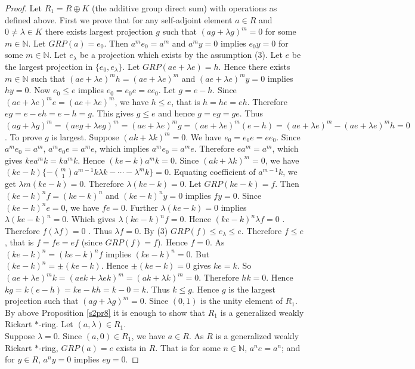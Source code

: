 \documentclass[10pt,a4paper]{amsart}
\begin{document}
\begin{proof} Let $ R_1 = R\oplus K$ (the additive group direct sum) with operations as defined above. First we prove that for any self-adjoint element $a\in R$ and $0 \ne \lambda \in K$ there exists largest projection $g$ such that $(ag+\lambda g)^m=0$ for some $m\in\mathbb N $. Let $GRP(a)=e_0$.
	Then  $a^me_0=a^m$ and $a^my=0$ implies $e_0y=0$ for some $m\in\mathbb N$. 
	Let $e_\lambda$ be a projection which exists by the assumption (3).
	Let $e$ be the largest projection in $\{e_0,e_\lambda\}$.
	Let $GRP(ae+\lambda e)=h$. Hence there exists $ m\in\mathbb N$ such that $(ae+\lambda e)^mh=(ae+\lambda e)^m$ and  $(ae+\lambda e)^my=0$ implies $hy=0$.  Now $e_0\leq e$ implies $e_0=e_0e=ee_0$.
	Let $g = e-h$.	Since $(ae+\lambda e)^me=(ae+\lambda e)^m$, we have $h\leq e$, that is $h=he =eh$. Therefore $eg=e-eh=e-h=g$. This gives $g\leq e$ and hence $g=eg=ge$.
	Thus $(ag+\lambda g)^m=(a eg+\lambda eg)^m=(ae+\lambda e)^mg
	=(ae+\lambda e)^m(e-h)=(ae+\lambda e)^m-(ae+\lambda e)^mh=0$.
	To prove $g$ is largest. Suppose $(ak+\lambda k)^m=0$. We have $e_0=e_0e=ee_0$. Since $a^me_0=a^m$, $a^me_0e=a^me$, which implies $a^me_0=a^me$. Therefore $ea^m=a^m$, which gives $kea^mk=ka^mk$. Hence $(ke-k)a^mk=0$. Since $(ak+\lambda k)^m=0$, we have $(ke-k)\{-\binom{m}{1}a^{m-1}k\lambda k-\cdots-\lambda^mk\}=0$. Equating coefficient of $a^{m-1}k$, we get  $\lambda m (ke-k)=0$. 
	Therefore $\lambda (ke-k)=0$. Let $GRP(ke-k)=f$. Then $(ke-k)^nf=	(ke-k)^n $ and $(ke-k)^ny=0$ implies  $fy=0$. Since $(ke-k)^ne=0$, we have $fe=0$. Further $\lambda (ke-k)=0$ implies $\lambda (ke-k)^n=0$.  Which gives $\lambda (ke-k)^nf=0$. Hence $ (ke-k)^n\lambda f=0$ . Therefore $f(\lambda f)=0$ . Thus $\lambda f=0$. By (3) $GRP(f)\leq e_\lambda\leq e$. Therefore $f\leq e$, that is $f=fe=ef$ (since $GRP(f)=f$). Hence $f=0$. As $(ke-k)^n= (ke-k)^nf$ implies $(ke-k)^n=0$. But $(ke-k)^n=\pm (ke-k)$. Hence $\pm (ke-k) =0$ gives $ke=k$. So $(ae+\lambda e)^m k=(aek+\lambda ek)^m=(ak+\lambda k)^m=0$. Therefore $hk=0$. Hence $kg=k(e-h)=ke-kh=k-0=k$. Thus $k\leq g$. Hence $g$ is the largest projection  such that $(ag+\lambda g)^m=0$.  Since $(0,1)$ is the unity element of $R_1$. By above Proposition \ref{s2pr8}  it is enough to show that $R_1$ is a generalized weakly Rickart $*$-ring. Let $(a,\lambda)\in R_1$.\\
	Suppose $\lambda=0$. Since $(a,0)\in R_1$, we have $a\in R$. 
	As $R$ is a generalized weakly Rickart $*$-ring, $GRP(a)=e$ exists in $R$.
	That is for some $n\in \mathbb N$, $a^ne=a^n$; and for $y \in R$, $a^ny=0$ implies $ey=0$.

\end{proof}
\end{document}
